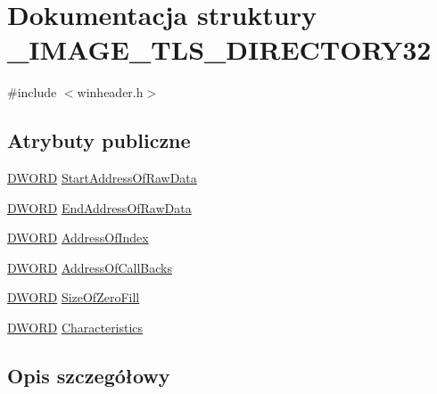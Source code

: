 \hypertarget{struct___i_m_a_g_e___t_l_s___d_i_r_e_c_t_o_r_y32}{\section{Dokumentacja struktury \-\_\-\-I\-M\-A\-G\-E\-\_\-\-T\-L\-S\-\_\-\-D\-I\-R\-E\-C\-T\-O\-R\-Y32}
\label{struct___i_m_a_g_e___t_l_s___d_i_r_e_c_t_o_r_y32}
}


{\ttfamily \#include $<$winheader.\-h$>$}

\subsection*{Atrybuty publiczne}
\begin{DoxyCompactItemize}
\item 
\hyperlink{winheader_8h_af483253b2143078cede883fc3c111ad2}{D\-W\-O\-R\-D} \hyperlink{struct___i_m_a_g_e___t_l_s___d_i_r_e_c_t_o_r_y32_a132e912376ff214a7ca2df977890c58d}{Start\-Address\-Of\-Raw\-Data}
\item 
\hyperlink{winheader_8h_af483253b2143078cede883fc3c111ad2}{D\-W\-O\-R\-D} \hyperlink{struct___i_m_a_g_e___t_l_s___d_i_r_e_c_t_o_r_y32_aff760067d4ededf860bb717d4de97745}{End\-Address\-Of\-Raw\-Data}
\item 
\hyperlink{winheader_8h_af483253b2143078cede883fc3c111ad2}{D\-W\-O\-R\-D} \hyperlink{struct___i_m_a_g_e___t_l_s___d_i_r_e_c_t_o_r_y32_a45bba3580baa7a89ec66ca4aa29cdc3b}{Address\-Of\-Index}
\item 
\hyperlink{winheader_8h_af483253b2143078cede883fc3c111ad2}{D\-W\-O\-R\-D} \hyperlink{struct___i_m_a_g_e___t_l_s___d_i_r_e_c_t_o_r_y32_ac2b279a00258cd0599dbb88e1f086d82}{Address\-Of\-Call\-Backs}
\item 
\hyperlink{winheader_8h_af483253b2143078cede883fc3c111ad2}{D\-W\-O\-R\-D} \hyperlink{struct___i_m_a_g_e___t_l_s___d_i_r_e_c_t_o_r_y32_aa9746f752a09d2c5cace07a133a676fd}{Size\-Of\-Zero\-Fill}
\item 
\hyperlink{winheader_8h_af483253b2143078cede883fc3c111ad2}{D\-W\-O\-R\-D} \hyperlink{struct___i_m_a_g_e___t_l_s___d_i_r_e_c_t_o_r_y32_a8428d0a94518288a8ae357f2be87052f}{Characteristics}
\end{DoxyCompactItemize}


\subsection{Opis szczegółowy}


